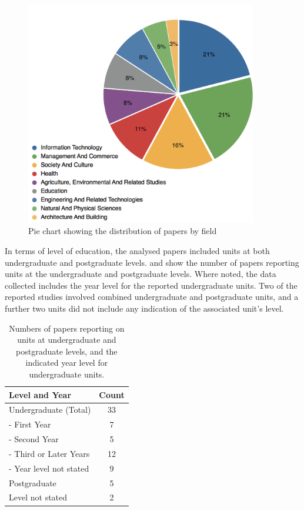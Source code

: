 \begin{figure}[p]
	\centering
	\includegraphics[width=0.9\textwidth]{Degrees}
	\caption{Pie chart showing the distribution of papers by field}
	\label{fig:degree_dist}
\end{figure}

In terms of level of education, the analysed papers included units at both undergraduate and postgraduate levels.  and  show the number of papers reporting units at the undergraduate and postgraduate levels. Where noted, the data collected includes the year level for the reported undergraduate units. Two of the reported studies involved combined undergraduate and postgraduate units, and a further two units did not include any indication of the associated unit's level.

\begin{table}[p]
	\centering
	\caption{Numbers of papers reporting on units at undergraduate and postgraduate levels, and the indicated year level for undergraduate units.}
	\label{tbl:year_level}
	\footnotesize
    \begin{tabular}{lc}
    \textbf{Level and Year} & \textbf{Count} \\ \hline
		Undergraduate (Total)	 & 33 \\
		- First Year & 	7 \\
		- Second Year & 	5 \\
		- Third or Later Years	 & 12 \\
		- Year level not stated & 	9 \\
		Postgraduate & 	5 \\
		Level not stated & 2 \\
    \end{tabular}
\end{table}

